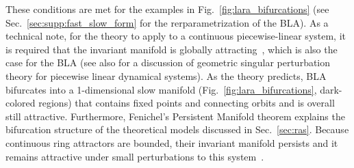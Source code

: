 \documentclass{article} %
\newcounter{ct}
\theoremstyle{definition}
\theoremstyle{remark}
\renewcommand{\cite}{\citep}
\begin{document}
These conditions are met for the examples in Fig.~\ref{fig:lara_bifurcations} (see Sec.~\ref{sec:supp:fast_slow_form} for the rerparametrization of the BLA).
 As a technical note, for the theory to apply to a continuous piecewise-linear system, it is required that the invariant manifold is globally attracting~\cite{simpson2018}, which is also the case for the BLA (see also \citep{prohens2013canard,prohens2016slow} for a discussion of geometric singular perturbation theory for piecewise linear dynamical systems).
As the theory predicts, BLA bifurcates into a 1-dimensional slow manifold (Fig.~\ref{fig:lara_bifurcations}, dark-colored regions) that contains fixed points and connecting orbits and is overall still attractive.
Furthermore, Fenichel's Persistent Manifold theorem explains the bifurcation structure of the theoretical models discussed in Sec.~\ref{sec:ras}.
Because continuous ring attractors are bounded, their invariant manifold persists and it remains attractive under small perturbations to this system~\citep{wiggins1994}.


\end{document}
